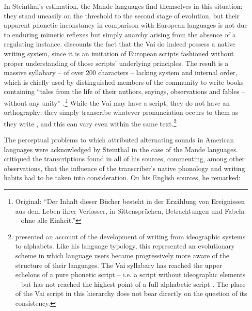 \documentclass[output=paper]{langscibook}
\begin{document}
In Steinthal's estimation, the Mande languages find themselves in this situation: they stand uneasily on the threshold to the second stage of evolution, but their apparent phonetic inconstancy in comparison with European languages is not due to enduring mimetic reflexes but simply anarchy arising from the absence of a regulating instance. \citet[257-266]{Steinthal1867} discounts the fact that the Vai do indeed possess a native writing system, since it is an imitation of European scripts fashioned without proper understanding of those scripts' underlying principles. The result is a massive syllabary – of over 200 characters – lacking system and internal order, which is chiefly used by distinguished members of the community to write books containing ``tales from the life of their authors, sayings, observations and fables – without any unity'' \citep[260]{Steinthal1867}.\footnote{Original: ``Der Inhalt dieser Bücher besteht in der Erzählung von Ereignissen aus dem Leben ihrer Verfasser, in Sittensprüchen, Betrachtungen und Fabeln – ohne alle Einheit.''} While the Vai may have a script, they do not have an orthography: they simply transcribe whatever pronunciation occurs to them as they write \citep[264-266]{Steinthal1867}, and this can vary even within the same text.\footnote{\citet{Steinthal1852} presented an account of the development of writing from ideographic systems to alphabets. Like his language typology, this represented an evolutionary scheme in which language users became progressively more aware of the structure of their languages. The Vai syllabary has reached the upper echelons of a pure phonetic script – i.e. a script without ideographic elements – but has not reached the highest point of a full alphabetic script \citep[262-264]{Steinthal1867}. The place of the Vai script in this hierarchy does not bear directly on the question of its consistency.}

The perceptual problems to which \citet{Boas1889} attributed alternating sounds in American languages were acknowledged by Steinthal in the case of the Mande languages. \citet{Steinthal1867} critiqued the transcriptions found in all of his sources, commenting, among other observations, that the influence of the transcriber's native phonology and writing habits had to be taken into consideration. On his English sources, he remarked:
\end{document}
